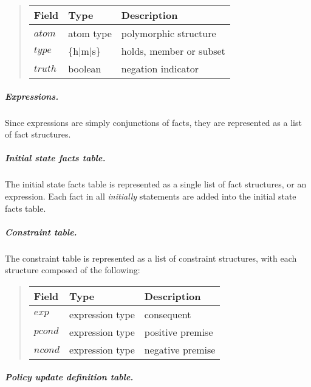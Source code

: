 \documentclass[10pt, twocolumn]{article}
\begin{document}
            \begin{quote}
              \begin{tabular}[t]{|l|l|l|}
                \hline
                \textbf{Field} & \textbf{Type} & \textbf{Description} \\
                \hline
                $atom$ & atom type & polymorphic structure \\
                \hline
                $type$ & \{h$|$m$|$s\} & holds, member or subset \\
                \hline
                $truth$ & boolean & negation indicator \\
                \hline
              \end{tabular}
            \end{quote}

          \subparagraph{Expressions.}

            Since expressions are simply conjunctions of facts, they are
            represented as a list of fact structures.

          \subparagraph{Initial state facts table.}

            The initial state facts table is represented as a single list of
            fact structures, or an expression. Each fact in all {\em initially}
            statements are added into the initial state facts table.

          \subparagraph{Constraint table.}

            The constraint table is represented as a list of constraint
            structures, with each structure composed of the following:

            \begin{quote}
              \begin{tabular}[t]{|l|l|l|}
                \hline
                \textbf{Field} & \textbf{Type} & \textbf{Description} \\
                \hline
                $exp$ & expression type & consequent \\
                \hline
                $pcond$ & expression type & positive premise \\
                \hline
                $ncond$ & expression type & negative premise \\
                \hline
              \end{tabular}
            \end{quote}

          \subparagraph{Policy update definition table.}
\end{document}
